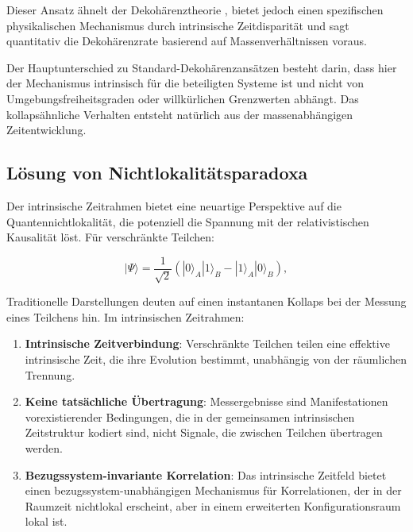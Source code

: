 \documentclass[12pt,a4paper]{article}
\begin{document}
	Dieser Ansatz ähnelt der Dekohärenztheorie \cite{Joos1985, Zurek2003}, bietet jedoch einen spezifischen physikalischen Mechanismus durch intrinsische Zeitdisparität und sagt quantitativ die Dekohärenzrate basierend auf Massenverhältnissen voraus.
	
	Der Hauptunterschied zu Standard-Dekohärenzansätzen besteht darin, dass hier der Mechanismus intrinsisch für die beteiligten Systeme ist und nicht von Umgebungsfreiheitsgraden oder willkürlichen Grenzwerten abhängt. Das kollapsähnliche Verhalten entsteht natürlich aus der massenabhängigen Zeitentwicklung.
	
	\subsection{Lösung von Nichtlokalitätsparadoxa}
	\label{subsec:nonlocality_resolution}
	
	Der intrinsische Zeitrahmen bietet eine neuartige Perspektive auf die Quantennichtlokalität, die potenziell die Spannung mit der relativistischen Kausalität löst. Für verschränkte Teilchen:
	
	\begin{equation}
		|\Psi\rangle = \frac{1}{\sqrt{2}}(|0\rangle_A |1\rangle_B - |1\rangle_A |0\rangle_B),
		\label{eq:entangled_state_resolution}
	\end{equation}
	
	Traditionelle Darstellungen deuten auf einen instantanen Kollaps bei der Messung eines Teilchens hin. Im intrinsischen Zeitrahmen:
	
	\begin{enumerate}
		\item \textbf{Intrinsische Zeitverbindung}: Verschränkte Teilchen teilen eine effektive intrinsische Zeit, die ihre Evolution bestimmt, unabhängig von der räumlichen Trennung.
		
		\item \textbf{Keine tatsächliche Übertragung}: Messergebnisse sind Manifestationen vorexistierender Bedingungen, die in der gemeinsamen intrinsischen Zeitstruktur kodiert sind, nicht Signale, die zwischen Teilchen übertragen werden.
		
		\item \textbf{Bezugssystem-invariante Korrelation}: Das intrinsische Zeitfeld bietet einen bezugssystem-unabhängigen Mechanismus für Korrelationen, der in der Raumzeit nichtlokal erscheint, aber in einem erweiterten Konfigurationsraum lokal ist.
	\end{enumerate}
	
\end{document}
